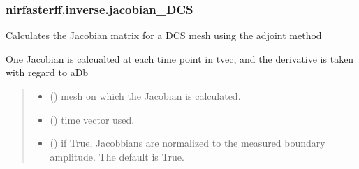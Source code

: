 \documentclass[letterpaper,10pt,english]{sphinxmanual}
\begin{document}
\sphinxstepscope


\subsubsection{nirfasterff.inverse.jacobian\_DCS}
\label{\detokenize{_autosummary/nirfasterff.inverse.jacobian_DCS:nirfasterff-inverse-jacobian-dcs}}\label{\detokenize{_autosummary/nirfasterff.inverse.jacobian_DCS::doc}}

\begin{fulllineitems}
\label{\detokenize{_autosummary/nirfasterff.inverse.jacobian_DCS:nirfasterff.inverse.jacobian_DCS}}
\pysigstartsignatures
\pysiglinewithargsret
{}
{\sphinxparamcomma {}\sphinxparamcomma {}\sphinxparamcomma {}\sphinxparamcomma {}}
{}
\pysigstopsignatures
\sphinxAtStartPar
Calculates the Jacobian matrix for a DCS mesh using the adjoint method

\sphinxAtStartPar
One Jacobian is calcualted at each time point in tvec, and the derivative is taken with regard to aDb
\begin{quote}\begin{description}
\begin{itemize}
\item {} 
\sphinxAtStartPar
{} () \textendash{} mesh on which the Jacobian is calculated.

\item {} 
\sphinxAtStartPar
{} () \textendash{} time vector used.

\item {} 
\sphinxAtStartPar
{} (\sphinxstyleliteralemphasis{\sphinxupquote{, }}) \textendash{} if True, Jacobbians are normalized to the measured boundary amplitude. The default is True.


\end{itemize}
\end{description}
\end{quote}
\end{fulllineitems}
\end{document}
